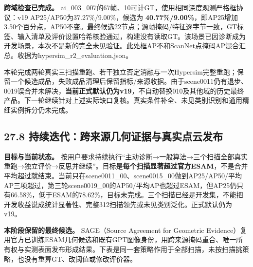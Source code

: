 \documentclass[UTF8,fontset=fandol]{ctexart}
\begin{document}
\textbf{跨域检查已完成。} ai\_003\_007的67帧、10可计GT，使用相同深度观测严格框协议：v19 AP25/AP50为37.27\%/9.00\%，候选为 \textbf{40.77\%/9.00\%}，即AP25增加3.50个百分点，AP50不变。最终候选22节点；源帧掩码/特征逐字节一致，GT标签、输入清单及评价设置哈希核验通过，构建没有读取GT。该场景已因诊断成为开发场景，本次不是新的完全未见验证。此处框AP不和ScanNet点掩码AP混合汇总。收据为hypersim\_r2\_evaluation.json。



本轮完成两轮真实三扫描重跑、若干独立否定消融与一次Hypersim完整重跑；保留一个候选成品，失败成品清理后保留指标/来源收据。由于scene0011仍有退步、0019误合并未解决，\textbf{当前正式默认仍为v19}，不自动替换010及其他域的历史最终产品。下一轮继续针对上述实际缺口复核。真实条件补全、未见类别识别和通用精细实例拆分仍未完成。



\subsection*{27.8 持续迭代：跨来源几何证据与真实点云发布}

\textbf{目标与当前状态。} 按用户要求持续执行“主动诊断→一般算法→三个扫描全部真实重跑→独立评价→反思并继续”。目标是\textbf{每个扫描显著超过官方ESAM}，不是合并平均超过就结束。当前只在scene0011\_00、scene0015\_00做到AP25/AP50/平均AP三项超过，第三轮scene0019\_00的AP50/平均AP也超过ESAM，但AP25仍只有66.58\%，低于ESAM的78.62\%，目标未完成。三个扫描已经是开发集，不能把开发收益说成统计显著性、完整312扫描领先或未见类别泛化。正式默认仍为v19。



\textbf{本阶段保留的最终候选。} SAGE（Source Agreement for Geometric Evidence）复用官方已训练ESAM几何候选和既有GPT图像身份，用跨来源掩码重合、唯一所有权与实测表面发布形成结果。下表是同一套策略作用于全部扫描，未按扫描挑策略，也没有重算GT、改阈值或修改评价器。
\end{document}
